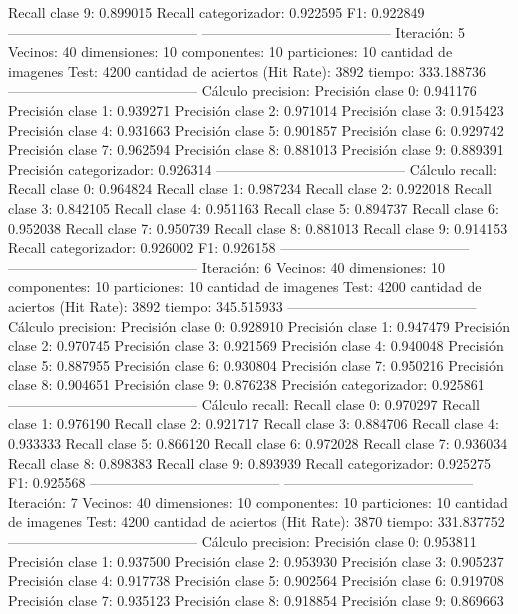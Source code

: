 Recall clase 9: 0.899015
Recall categorizador: 0.922595
F1: 0.922849
-----------------------------------------
-----------------------------------------
Iteración: 5
Vecinos: 40
dimensiones: 10
componentes: 10
particiones: 10
cantidad de imagenes Test: 4200
cantidad de aciertos (Hit Rate): 3892
tiempo: 333.188736
-----------------------------------------
Cálculo precision: 
Precisión clase 0: 0.941176
Precisión clase 1: 0.939271
Precisión clase 2: 0.971014
Precisión clase 3: 0.915423
Precisión clase 4: 0.931663
Precisión clase 5: 0.901857
Precisión clase 6: 0.929742
Precisión clase 7: 0.962594
Precisión clase 8: 0.881013
Precisión clase 9: 0.889391
Precisión categorizador: 0.926314
-----------------------------------------
Cálculo recall: 
Recall clase 0: 0.964824
Recall clase 1: 0.987234
Recall clase 2: 0.922018
Recall clase 3: 0.842105
Recall clase 4: 0.951163
Recall clase 5: 0.894737
Recall clase 6: 0.952038
Recall clase 7: 0.950739
Recall clase 8: 0.881013
Recall clase 9: 0.914153
Recall categorizador: 0.926002
F1: 0.926158
-----------------------------------------
-----------------------------------------
Iteración: 6
Vecinos: 40
dimensiones: 10
componentes: 10
particiones: 10
cantidad de imagenes Test: 4200
cantidad de aciertos (Hit Rate): 3892
tiempo: 345.515933
-----------------------------------------
Cálculo precision: 
Precisión clase 0: 0.928910
Precisión clase 1: 0.947479
Precisión clase 2: 0.970745
Precisión clase 3: 0.921569
Precisión clase 4: 0.940048
Precisión clase 5: 0.887955
Precisión clase 6: 0.930804
Precisión clase 7: 0.950216
Precisión clase 8: 0.904651
Precisión clase 9: 0.876238
Precisión categorizador: 0.925861
-----------------------------------------
Cálculo recall: 
Recall clase 0: 0.970297
Recall clase 1: 0.976190
Recall clase 2: 0.921717
Recall clase 3: 0.884706
Recall clase 4: 0.933333
Recall clase 5: 0.866120
Recall clase 6: 0.972028
Recall clase 7: 0.936034
Recall clase 8: 0.898383
Recall clase 9: 0.893939
Recall categorizador: 0.925275
F1: 0.925568
-----------------------------------------
-----------------------------------------
Iteración: 7
Vecinos: 40
dimensiones: 10
componentes: 10
particiones: 10
cantidad de imagenes Test: 4200
cantidad de aciertos (Hit Rate): 3870
tiempo: 331.837752
-----------------------------------------
Cálculo precision: 
Precisión clase 0: 0.953811
Precisión clase 1: 0.937500
Precisión clase 2: 0.953930
Precisión clase 3: 0.905237
Precisión clase 4: 0.917738
Precisión clase 5: 0.902564
Precisión clase 6: 0.919708
Precisión clase 7: 0.935123
Precisión clase 8: 0.918854
Precisión clase 9: 0.869663
